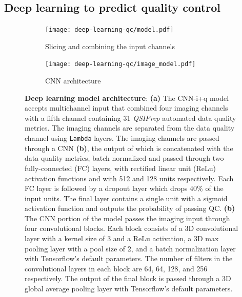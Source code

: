 \documentclass[fleqn,10pt,inline]{wlscirep}
\begin{document}
\subsection*{Deep learning to predict quality control}

\begin{figure}[tbp]
    \begin{subfigure}[t]{0.6\linewidth}
    \centering
    \texttt{[image: deep-learning-qc/model.pdf]}
    \caption{Slicing and combining the input channels}
    \label{fig:dl-architecture:complete}
    \end{subfigure}
    \begin{subfigure}[t]{0.4\linewidth}
    \centering
    \texttt{[image: deep-learning-qc/image\_model.pdf]}
    \caption{CNN architecture}
    \label{fig:dl-architecture:cnn}
    \end{subfigure}
    \caption{%
        {\bf Deep learning model architecture}:
        \textbf{(a)} The CNN-i+q model accepts multichannel input that combined
        four imaging channels with a fifth channel containing 31 \emph{QSIPrep}
        automated data quality metrics. The imaging channels are separated from the data quality
        channel using \texttt{Lambda} layers. The imaging channels are passed
        through a CNN \textbf{(b)}, the output of which is concatenated with the
        data quality metrics, batch normalized and passed through two fully-connected (FC)
        layers, with rectified linear unit (ReLu) activation functions and with
        512 and 128 units respectively. Each FC layer is followed by a dropout
        layer which drops 40\% of the input units. The final layer contains a
        single unit with a sigmoid activation function and outputs the
        probability of passing QC.
        \textbf{(b)} The CNN portion of the model passes the imaging input
        through four convolutional blocks. Each block consists of a 3D
        convolutional layer with a kernel size of 3 and a ReLu activation, a 3D
        max pooling layer with a pool size of 2, and a batch normalization layer
        with Tensorflow's default parameters. The number of filters in the
        convolutional layers in each block are 64, 64, 128, and 256 respectively.
        The output of the final block is passed through a 3D global average
        pooling layer with Tensorflow's default parameters.
    }
    \label{fig:dl-architecture}
\end{figure}
\end{document}
